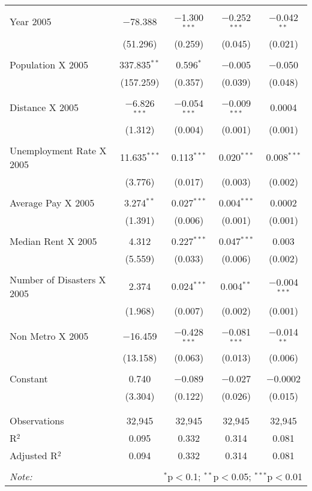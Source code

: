 \documentclass[]{article}
\begin{document}
\begin{table}[!htbp]
\begin{tabular}{@{\extracolsep{5pt}}lcccc}
  & & & & \\ 
 Year 2005 & $-$78.388 & $-$1.300$^{***}$ & $-$0.252$^{***}$ & $-$0.042$^{**}$ \\ 
  & (51.296) & (0.259) & (0.045) & (0.021) \\ 
  & & & & \\ 
 Population X 2005 & 337.835$^{**}$ & 0.596$^{*}$ & $-$0.005 & $-$0.050 \\ 
  & (157.259) & (0.357) & (0.039) & (0.048) \\ 
  & & & & \\ 
 Distance X 2005 & $-$6.826$^{***}$ & $-$0.054$^{***}$ & $-$0.009$^{***}$ & 0.0004 \\ 
  & (1.312) & (0.004) & (0.001) & (0.001) \\ 
  & & & & \\ 
 Unemployment Rate X 2005  & 11.635$^{***}$ & 0.113$^{***}$ & 0.020$^{***}$ & 0.008$^{***}$ \\ 
  & (3.776) & (0.017) & (0.003) & (0.002) \\ 
  & & & & \\ 
 Average Pay X 2005 & 3.274$^{**}$ & 0.027$^{***}$ & 0.004$^{***}$ & 0.0002 \\ 
  & (1.391) & (0.006) & (0.001) & (0.001) \\ 
  & & & & \\ 
 Median Rent X 2005 & 4.312 & 0.227$^{***}$ & 0.047$^{***}$ & 0.003 \\ 
  & (5.559) & (0.033) & (0.006) & (0.002) \\ 
  & & & & \\ 
 Number of Disasters X 2005 & 2.374 & 0.024$^{***}$ & 0.004$^{**}$ & $-$0.004$^{***}$ \\ 
  & (1.968) & (0.007) & (0.002) & (0.001) \\ 
  & & & & \\ 
 Non Metro X 2005 & $-$16.459 & $-$0.428$^{***}$ & $-$0.081$^{***}$ & $-$0.014$^{**}$ \\ 
  & (13.158) & (0.063) & (0.013) & (0.006) \\ 
  & & & & \\ 
 Constant & 0.740 & $-$0.089 & $-$0.027 & $-$0.0002 \\ 
  & (3.304) & (0.122) & (0.026) & (0.015) \\ 
  & & & & \\ 
\hline \\[-1.8ex] 
Observations & 32,945 & 32,945 & 32,945 & 32,945 \\ 
R$^{2}$ & 0.095 & 0.332 & 0.314 & 0.081 \\ 
Adjusted R$^{2}$ & 0.094 & 0.332 & 0.314 & 0.081 \\ 
\hline 
\hline \\[-1.8ex] 
\textit{Note:}  & \multicolumn{4}{r}{$^{*}$p$<$0.1; $^{**}$p$<$0.05; $^{***}$p$<$0.01} \\ 
\end{tabular} 
\end{table}
\end{document}

